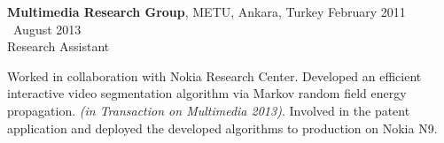     \textbf{Multimedia Research Group}, METU, Ankara, Turkey \hfill February 2011 \textendash ~August 2013\vspace{0.5mm}\\\vspace{0mm}
	\hspace{-1mm}Research Assistant  \hfill \vspace{-5mm}\\\vspace{0mm}

	Worked in collaboration with Nokia Research Center. Developed an efficient interactive video segmentation algorithm via Markov random field energy propagation. \emph{(in Transaction on Multimedia 2013)}.	Involved in the patent application and deployed the developed algorithms to production on Nokia N9.
